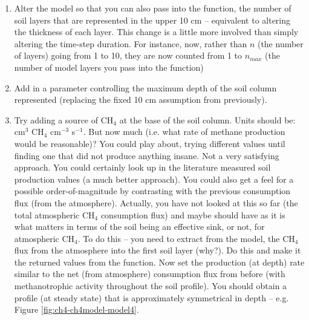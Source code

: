 \documentclass{tufte-book} %
\begin{document}
\begin{enumerate}
\setlength{\itemindent}{.2in}

\item Alter the model so that you can also pass into the function, the number of soil layers that are represented in the upper 10 cm -- equivalent to altering the thickness of each layer. This change is a little more involved than simply altering the time-step duration. For instance, now, rather than \(n\) (the number of layers) going from 1 to 10, they are now counted from 1 to \(n_{max}\) (the number of model layers you pass into the function)

\item Add in a parameter controlling the maximum depth of the soil column represented (replacing the fixed 10 cm assumption from previously). 

\item Try adding a source of CH\(_{4}\) at the base of the soil column.  Units should be: cm\(^{3}\) CH\(_{4}\) cm\(^{-3}\) s\(^{-1}\). But now much (i.e. what rate of methane production would be reasonable)? You could play about, trying different values until finding one that did not produce anything insane. Not a very satisfying approach. You could certainly look up in the literature measured soil production values (a much better approach). You could also get a feel for a possible order-of-magnitude by contrasting with the previous consumption flux (from the atmosphere). Actually, you have not looked at this so far (the total atmospheric CH\(_{4}\) consumption flux) and maybe should have as it is what matters in terms of the soil being an effective sink, or not, for atmospheric CH\(_{4}\). To do this -- you need to extract from the model, the CH\(_{4}\) flux from the atmosphere into the first soil layer (why?).
 Do this and make it the returned values from the function.
Now set the production (at depth) rate similar to the net (from atmosphere) consumption flux from before (with methanotrophic activity throughout the soil profile). You should obtain a profile (at steady state) that is approximately symmetrical in depth -- e.g. Figure \ref{fig:ch4-ch4model-model4}.


\end{enumerate}
\end{document}
